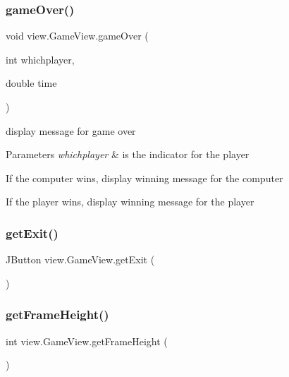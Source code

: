 \subsubsection{\texorpdfstring{game\+Over()}{gameOver()}}
{\footnotesize\ttfamily void view.\+Game\+View.\+game\+Over (\begin{DoxyParamCaption}\item[{int}]{whichplayer,  }\item[{double}]{time }\end{DoxyParamCaption})}



display message for game over 


\begin{DoxyParams}{Parameters}
{\em whichplayer} & is the indicator for the player \\
\hline
\end{DoxyParams}

\begin{DoxyItemize}
\item If the computer wins, display winning message for the computer
\item If the player wins, display winning message for the player
\end{DoxyItemize}\hypertarget{classview_1_1_game_view_ae143f3589b520f0db09dd77e88a73c06}{}\label{classview_1_1_game_view_ae143f3589b520f0db09dd77e88a73c06} 
\subsubsection{\texorpdfstring{get\+Exit()}{getExit()}}
{\footnotesize\ttfamily J\+Button view.\+Game\+View.\+get\+Exit (\begin{DoxyParamCaption}{ }\end{DoxyParamCaption})}

\hypertarget{classview_1_1_game_view_a741912e646a65f33e3c571002ed0cf22}{}\label{classview_1_1_game_view_a741912e646a65f33e3c571002ed0cf22} 
\subsubsection{\texorpdfstring{get\+Frame\+Height()}{getFrameHeight()}}
{\footnotesize\ttfamily int view.\+Game\+View.\+get\+Frame\+Height (\begin{DoxyParamCaption}{ }\end{DoxyParamCaption})}



